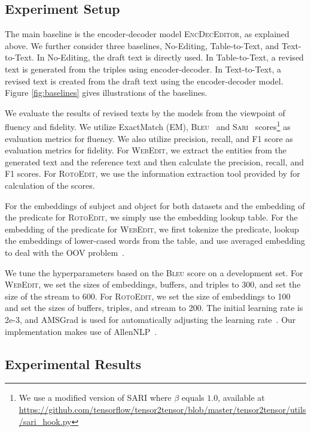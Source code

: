 \documentclass[11pt,a4paper]{article}
\begin{document}
\subsection{Experiment Setup}

The main baseline is the encoder-decoder model \textsc{EncDecEditor}, as explained above. We further consider three baselines, No-Editing, Table-to-Text, and Text-to-Text. In No-Editing, the draft text is directly used.
In Table-to-Text, a revised text is generated from the triples using encoder-decoder. In Text-to-Text, a revised text is created from the draft text using the encoder-decoder model.
Figure \ref{fig:baselines} gives illustrations of the baselines.

We evaluate the results of revised texts by the models from the viewpoint of fluency and fidelity. We utilize ExactMatch (EM), \textsc{Bleu}~\cite{papineni-etal-2002-bleu} and \textsc{Sari}~\cite{xu2016optimizing} scores\footnote{We use a modified version of \textsc{SARI} where $\beta$ equals $1.0$, available at \url{https://github.com/tensorflow/tensor2tensor/blob/master/tensor2tensor/utils/sari_hook.py}} as evaluation metrics for fluency. We also utilize precision, recall, and F1 score as evaluation metrics for fidelity. For \textsc{WebEdit}, we extract the entities from the generated text and the reference text and then calculate the precision, recall, and F1 scores. For \textsc{RotoEdit}, we use the information extraction tool provided by \citet{wiseman2017challenges} for calculation of the scores.

For the embeddings of subject and object for both datasets and the embedding of the predicate for \textsc{RotoEdit}, we simply use the embedding lookup table. For the embedding of the predicate for \textsc{WebEdit}, we first tokenize the predicate, lookup the embeddings of lower-cased words from the table, and use averaged embedding to deal with the OOV problem~\cite{moryossef2019step}.

We tune the hyperparameters based on the \textsc{Bleu} score on a development set. For \textsc{WebEdit}, we set the sizes of embeddings, buffers, and triples to 300, and set the size of the stream to 600. For \textsc{RotoEdit}, we set the size of embeddings to 100 and set the sizes of buffers, triples, and stream to 200. The initial learning rate is 2e-3, and AMSGrad is used for automatically adjusting the learning rate~\cite{reddi2018convergence}. Our implementation makes use of AllenNLP~\cite{gardner2018allennlp}.

\subsection{Experimental Results}
\label{sec:results}
\end{document}
